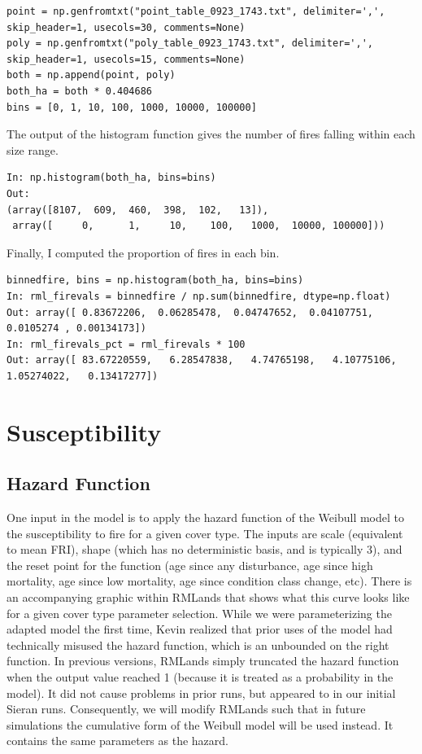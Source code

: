 \begin{lstlisting}
point = np.genfromtxt("point_table_0923_1743.txt", delimiter=',', skip_header=1, usecols=30, comments=None)
poly = np.genfromtxt("poly_table_0923_1743.txt", delimiter=',', skip_header=1, usecols=15, comments=None)
both = np.append(point, poly)
both_ha = both * 0.404686
bins = [0, 1, 10, 100, 1000, 10000, 100000]
\end{lstlisting}



The output of the histogram function gives the number of fires falling within each size range.
\begin{lstlisting}
In: np.histogram(both_ha, bins=bins)
Out: 
(array([8107,  609,  460,  398,  102,   13]),
 array([     0,      1,     10,    100,   1000,  10000, 100000]))
\end{lstlisting}

Finally, I computed the proportion of fires in each bin.
\begin{lstlisting}
binnedfire, bins = np.histogram(both_ha, bins=bins)
In: rml_firevals = binnedfire / np.sum(binnedfire, dtype=np.float)
Out: array([ 0.83672206,  0.06285478,  0.04747652,  0.04107751,  0.0105274 , 0.00134173])
In: rml_firevals_pct = rml_firevals * 100
Out: array([ 83.67220559,   6.28547838,   4.74765198,   4.10775106, 1.05274022,   0.13417277])
\end{lstlisting}        

\section{Susceptibility}
\subsection{Hazard Function}
One input in the model is to apply the hazard function of the Weibull model to the susceptibility to fire for a given cover type. The inputs are scale (equivalent to mean FRI), shape (which has no deterministic basis, and is typically 3), and the reset point for the function (age since any disturbance, age since high mortality, age since low mortality, age since condition class change, etc). There is an accompanying graphic within RMLands that shows what this curve looks like for a given cover type parameter selection. While we were parameterizing the adapted model the first time, Kevin realized that prior uses of the model had technically misused the hazard function, which is an unbounded on the right function. In previous versions, RMLands simply truncated the hazard function when the output value reached 1 (because it is treated as a probability in the model). It did not cause problems in prior runs, but appeared to in our initial Sieran runs. Consequently, we will modify RMLands such that in future simulations the cumulative form of the Weibull model will be used instead. It contains the same parameters as the hazard.

